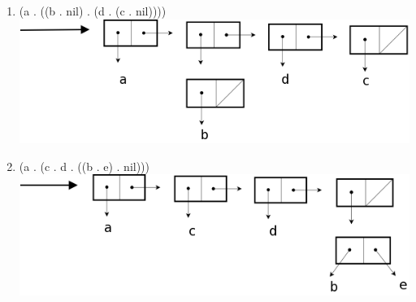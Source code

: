 \documentclass[a4paper, 11pt]{article}
\begin{document}
\begin{enumerate}
    \item (a . ((b . nil) . (d . (c . nil))))\\ \includegraphics[scale=0.3]{reponse5.png}
    \item (a . (c . d . ((b . e) . nil)))\\ \includegraphics[scale=0.3]{reponse6.png}
\end{enumerate}
%
\end{document}
